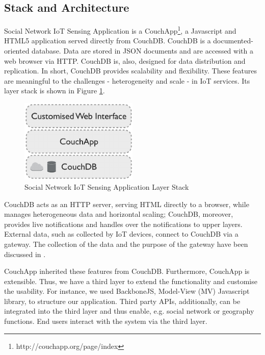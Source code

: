 \subsection{Stack and Architecture}
Social Network IoT Sensing Application is a CouchApp\footnote{http://couchapp.org/page/index}, a Javascript and HTML5 application served directly from CouchDB. CouchDB is a documented-oriented database. Data are stored in JSON documents and are accessed with a web browser via HTTP. CouchDB is, also, designed for data distribution and replication. In short, CouchDB provides scalability and flexibility. These features are meaningful to the challenges \cite{francesco2012storage} - heterogeneity and scale - in IoT services. Its layer stack is shown in Figure \ref{fig:data-centre-app-stack}.

\begin{figure}[t]
  \begin{center}
    \includegraphics[width=0.5\textwidth]{images/data-centre-app-stack.pdf}
    \caption{Social Network IoT Sensing Application Layer Stack}
    \label{fig:data-centre-app-stack}
  \end{center}
\end{figure}

CouchDB acts as an HTTP server, serving HTML directly to a browser, while manages heterogeneous data and horizontal scaling; CouchDB, moreover, provides live notifications and handles over the notifications to upper layers. External data, such as collected by IoT devices, connect to CouchDB via a gateway. The collection of the data and the purpose of the gateway have been discussed in \cite{francesco2012storage}. 

CouchApp inherited these features from CouchDB. Furthermore, CouchApp is extensible. Thus, we have a third layer to extend the functionality and customise the usability. For instance, we used BackboneJS, Model-View (MV) Javascript library, to structure our application. Third party APIs, additionally, can be integrated into the third layer and thus enable, e.g. social network or geography functions. End users interact with the system via the third layer. 


